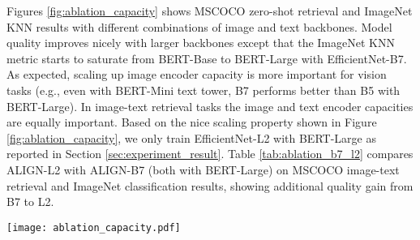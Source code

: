 \documentclass{article}
\begin{document}
Figures \ref{fig:ablation_capacity} shows MSCOCO zero-shot retrieval and ImageNet KNN results with different combinations of image and text backbones. Model quality improves nicely with larger backbones except that the ImageNet KNN metric starts to saturate from BERT-Base to BERT-Large with EfficientNet-B7. As expected, scaling up image encoder capacity is more important for vision tasks (e.g., even with BERT-Mini text tower, B7 performs better than B5 with BERT-Large). In image-text retrieval tasks the image and text encoder capacities are equally important. Based on the nice scaling property shown in Figure \ref{fig:ablation_capacity}, we only train EfficientNet-L2 with BERT-Large as reported in Section \ref{sec:experiment_result}. Table \ref{tab:ablation_b7_l2} compares ALIGN-L2 with ALIGN-B7 (both with BERT-Large) on MSCOCO image-text retrieval and ImageNet classification results, showing additional quality gain from B7 to L2.



\begin{figure*}[t]
\begin{center}
    \centerline{\texttt{[image: ablation\_capacity.pdf]}}
    \vskip -0.15in
    \caption{Zero-shot image-text retrieval and ImageNet KNN accuracy@1 with different image and text encoder sizes.}
    \label{fig:ablation_capacity}
    \vskip -0.3in
\end{center}
\end{figure*}

\begin{table*}[h!]
\vspace{-2mm}
\begin{center}
\caption{Comparison between ALIGN-B7 and ALIGN-L2.}
\vskip 0.05in
\label{tab:ablation_b7_l2}
\begin{small}
 \end{small}
\end{center}
\vspace{-5mm}
\end{table*}
\end{document}
